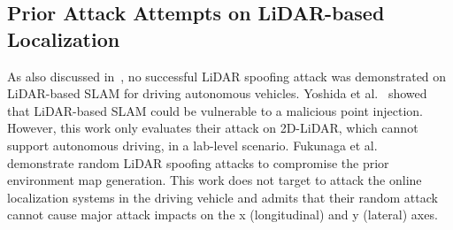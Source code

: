 \subsection{Prior Attack Attempts on LiDAR-based Localization} \label{sec:prior_attack}
As also discussed in~\cite{xu2023sok}, no successful LiDAR spoofing attack was demonstrated on LiDAR-based SLAM for driving autonomous vehicles. Yoshida et al.~\cite{yoshida2022adversarial} showed that LiDAR-based SLAM could be vulnerable to a malicious point injection. However, this work only evaluates their attack on 2D-LiDAR, which cannot support autonomous driving, in a lab-level scenario. %
Fukunaga et al.~\cite{fukunagarandom} demonstrate random LiDAR spoofing attacks to compromise the prior environment map generation. This work does not target to attack the online localization systems in the driving vehicle and admits that their random attack cannot cause major attack impacts on the x (longitudinal) and y (lateral) axes. %


